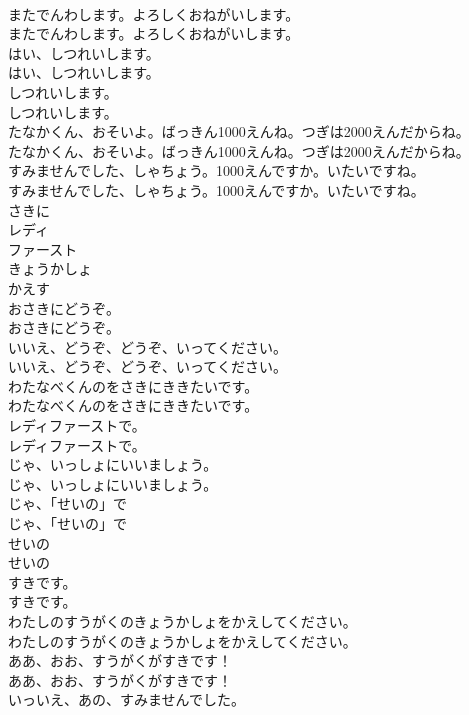 \documentclass[8pt]{extreport}
\begin{document}
\begin{CJK}{UTF8}{min}
\\	またでんわします。よろしくおねがいします。	
\\	またでんわします。よろしくおねがいします。 
\\	はい、しつれいします。	
\\	はい、しつれいします。 
\\	しつれいします。	
\\	しつれいします。 
\\	たなかくん、おそいよ。ばっきん1000えんね。つぎは2000えんだからね。	
\\	たなかくん、おそいよ。ばっきん1000えんね。つぎは2000えんだからね。 
\\	すみませんでした、しゃちょう。1000えんですか。いたいですね。	
\\	すみませんでした、しゃちょう。1000えんですか。いたいですね。 
\\	さきに
\\	レディ
\\	ファースト
\\	きょうかしょ
\\	かえす
\\	おさきにどうぞ。	
\\	おさきにどうぞ。 
\\	いいえ、どうぞ、どうぞ、いってください。	
\\	いいえ、どうぞ、どうぞ、いってください。 
\\	わたなべくんのをさきにききたいです。	
\\	わたなべくんのをさきにききたいです。 
\\	レディファーストで。	
\\	レディファーストで。 
\\	じゃ、いっしょにいいましょう。	
\\	じゃ、いっしょにいいましょう。 
\\	じゃ、「せいの」で	
\\	じゃ、「せいの」で 
\\	せいの	
\\	せいの 
\\	すきです。	
\\	すきです。 
\\	わたしのすうがくのきょうかしょをかえしてください。	
\\	わたしのすうがくのきょうかしょをかえしてください。 
\\	ああ、おお、すうがくがすきです！	
\\	ああ、おお、すうがくがすきです！ 
\\	いっいえ、あの、すみませんでした。	

\end{CJK}
\end{document}
